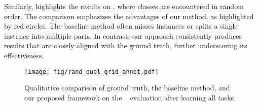 Similarly,  highlights the results on \rsplit, where classes are encountered in random order. The comparison emphasizes the advantages of our method, as highlighted by red circles. The baseline method often misses instances or splits a single instance into multiple parts. In contrast, our approach consistently produces results that are closely aligned with the ground truth, further underscoring its effectiveness.

\begin{figure*}[!htb]
  \centering
  \texttt{[image: fig/rand\_qual\_grid\_annot.pdf]}
  \caption{Qualitative comparison of ground truth, the baseline method, and our proposed framework on the \rsplit~ evaluation after learning all tasks.}
  \label{fig:rsplit_qual}
\end{figure*}